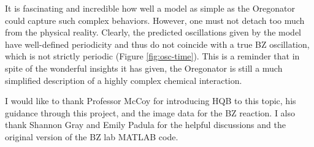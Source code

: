 \documentclass[twocolumn,amsmath,amssymb,aps]{revtex4}
\begin{document}
It is fascinating and incredible how well a model as simple as the Oregonator could capture such complex behaviors. However, one must not detach too much from the physical reality. Clearly, the predicted oscillations given by the model have well-defined periodicity and thus do not coincide with a true BZ oscillation, which is not strictly periodic (Figure \ref{fig:osc-time}). This is a reminder that in spite of the wonderful insights it has given, the Oregonator is still a much simplified description of a highly complex chemical interaction. 


\begin{acknowledgments}
I would like to thank Professor McCoy for introducing HQB to this topic, his guidance through this project, and the image data for the BZ reaction. I also thank Shannon Gray and Emily Padula for the helpful discussions and the original version of the BZ lab MATLAB code.  
\end{acknowledgments}



\end{document}
